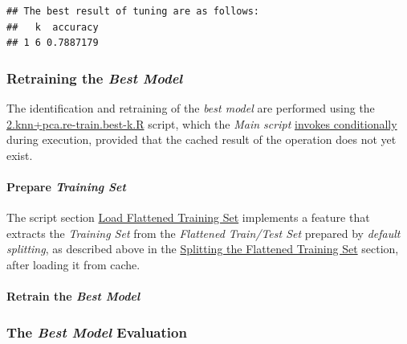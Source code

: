 \documentclass[
]{report}
\begin{document}
\begin{verbatim}
## The best result of tuning are as follows:
##   k  accuracy
## 1 6 0.7887179
\end{verbatim}

\subsubsection{\texorpdfstring{Retraining the \emph{Best Model}}{Retraining the Best Model}}\label{knn_pca_mcc.retraining_best}

The identification and retraining of the \emph{best model} are performed using the \href{https://github.com/AzKurban-edX-DS/edx.capstone.choose-your-own/blob/main/r/models/knn\%2Bpca-mcc/2.knn\%2Bpca.re-train.best-k.R}{2.knn+pca.re-train.best-k.R} script, which the \emph{Main script} \href{https://github.com/AzKurban-edX-DS/edx.capstone.choose-your-own/blob/main/r/index.R\#L218}{invokes conditionally} during execution, provided that the cached result of the operation does not yet exist.

\paragraph{\texorpdfstring{Prepare \emph{Training Set}}{Prepare Training Set}}\label{knn_pca_mcc.train_set.retrain}

\hfill\break

The script section \href{https://github.com/AzKurban-edX-DS/edx.capstone.choose-your-own/blob/main/r/models/knn\%2Bpca-mcc/2.knn\%2Bpca.re-train.best-k.R\#L18-L83}{Load Flattened Training Set} implements a feature that extracts the \emph{Training Set} from the \emph{Flattened Train/Test Set} prepared by \emph{default splitting}, as described above in the \hyperref[splitting-the-flattened-training-set]{Splitting the Flattened Training Set} section, after loading it from cache.

\paragraph{\texorpdfstring{Retrain the \emph{Best Model}}{Retrain the Best Model}}\label{knn_pca_mcc.best.retrain}

\hfill\break

\subsubsection{\texorpdfstring{The \emph{Best Model} Evaluation}{The Best Model Evaluation}}\label{knn_pca_mcc.evaluation_best}
\end{document}
